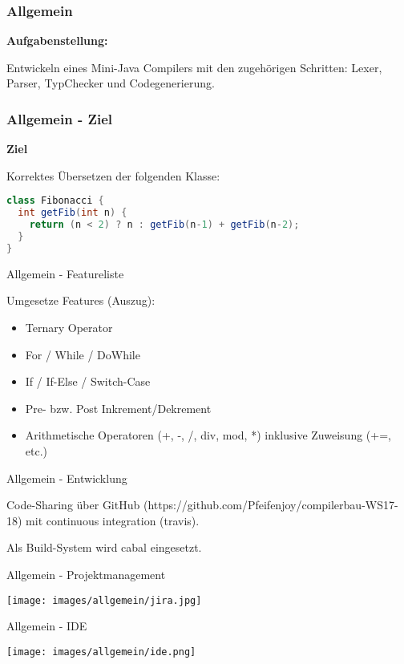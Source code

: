 \begin{frame}
	\frametitle{Allgemein}
	
\textbf{Aufgabenstellung:}

Entwickeln eines Mini-Java Compilers mit den zugehörigen Schritten: Lexer, Parser, TypChecker und Codegenerierung.
\end{frame}

\begin{frame}[fragile]
\frametitle{Allgemein - Ziel}

\textbf{Ziel} 

Korrektes Übersetzen der folgenden Klasse:

\begin{lstlisting}[language=Java]
class Fibonacci {
  int getFib(int n) {
    return (n < 2) ? n : getFib(n-1) + getFib(n-2);
  }
}
\end{lstlisting}	
\end{frame}



\begin{frame}{Allgemein - Featureliste}

Umgesetze Features (Auszug):

\pause

\begin{itemize}
	\item Ternary Operator \pause
	\item For / While / DoWhile \pause
	\item If / If-Else / Switch-Case \pause 
	\item Pre- bzw. Post Inkrement/Dekrement \pause 
	\item Arithmetische Operatoren (+, -, /, div, mod, *) inklusive Zuweisung (+=, etc.)
\end{itemize}	
\end{frame}

\begin{frame}{Allgemein - Entwicklung}

Code-Sharing über GitHub (https://github.com/Pfeifenjoy/compilerbau-WS17-18) mit continuous integration (travis).

\par \medskip

\pause

Als Build-System wird cabal eingesetzt.	
\end{frame}

\begin{frame}{Allgemein - Projektmanagement}

\texttt{[image: images/allgemein/jira.jpg]}

\end{frame}

\begin{frame}{Allgemein - IDE}

\texttt{[image: images/allgemein/ide.png]}

\end{frame}
